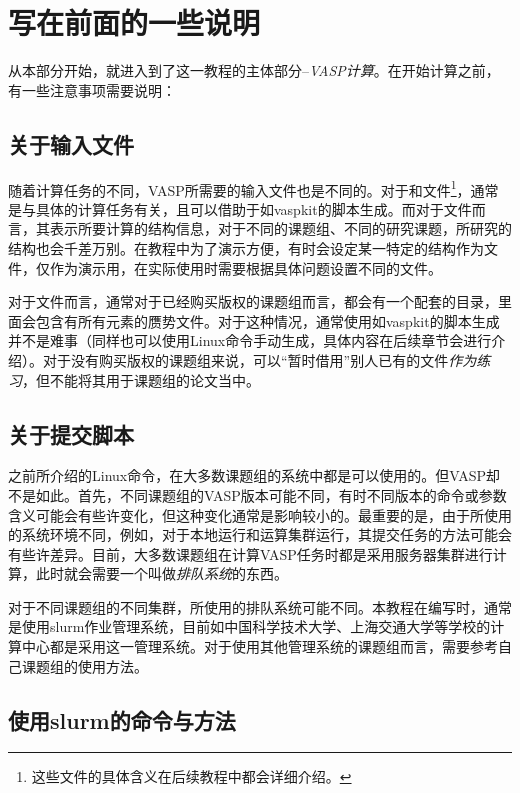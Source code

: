 \chapter*{写在前面的一些说明}

从本部分开始，就进入到了这一教程的主体部分--\emph{VASP计算}。在开始计算之前，有一些注意事项需要说明：

\section*{关于输入文件}

随着计算任务的不同，VASP所需要的输入文件也是不同的。对于和文件\footnote{这些文件的具体含义在后续教程中都会详细介绍。}，通常是与具体的计算任务有关，且可以借助于如vaspkit的脚本生成。而对于文件而言，其表示所要计算的结构信息，对于不同的课题组、不同的研究课题，所研究的结构也会千差万别。在教程中为了演示方便，有时会设定某一特定的结构作为文件，仅作为演示用，在实际使用时需要根据具体问题设置不同的文件。

对于文件而言，通常对于已经购买版权的课题组而言，都会有一个配套的目录，里面会包含有所有元素的赝势文件。对于这种情况，通常使用如vaspkit的脚本生成并不是难事（同样也可以使用Linux命令手动生成，具体内容在后续章节会进行介绍）。对于没有购买版权的课题组来说，可以“暂时借用”别人已有的文件\emph{作为练习}，但不能将其用于课题组的论文当中。

\section*{关于提交脚本}

之前所介绍的Linux命令，在大多数课题组的系统中都是可以使用的。但VASP却不是如此。首先，不同课题组的VASP版本可能不同，有时不同版本的命令或参数含义可能会有些许变化，但这种变化通常是影响较小的。最重要的是，由于所使用的系统环境不同，例如，对于本地运行和运算集群运行，其提交任务的方法可能会有些许差异。目前，大多数课题组在计算VASP任务时都是采用服务器集群进行计算，此时就会需要一个叫做\emph{排队系统}的东西。

对于不同课题组的不同集群，所使用的排队系统可能不同。本教程在编写时，通常是使用slurm作业管理系统，目前如中国科学技术大学、上海交通大学等学校的计算中心都是采用这一管理系统。对于使用其他管理系统的课题组而言，需要参考自己课题组的使用方法。

\section*{使用slurm的命令与方法}

